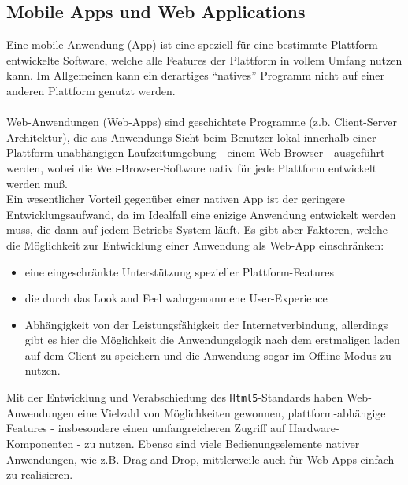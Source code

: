 \subsection{Mobile Apps und Web Applications}\label{4_MAWA}
Eine mobile Anwendung (App) ist eine speziell für eine bestimmte Plattform entwickelte Software, welche
alle Features der Plattform in vollem Umfang nutzen kann. Im Allgemeinen kann ein derartiges "`natives"' Programm nicht auf einer anderen Plattform genutzt werden.\\ \\
Web-Anwendungen (Web-Apps) sind geschichtete Programme (z.b. Client-Server Architektur), die aus Anwendungs-Sicht beim Benutzer lokal innerhalb einer Plattform-unabhängigen Laufzeitumgebung - einem Web-Browser - ausgeführt werden, wobei die Web-Browser-Software nativ für jede Plattform entwickelt werden muß.\\
Ein wesentlicher Vorteil gegenüber einer nativen App ist der geringere Entwicklungsaufwand, da im Idealfall eine enizige Anwendung entwickelt werden muss, die dann auf jedem Betriebs-System läuft. Es gibt aber Faktoren, welche die Möglichkeit zur Entwicklung einer Anwendung als Web-App einschränken:
\begin{itemize}[leftmargin=*,noitemsep,topsep=1ex,parsep=0pt,partopsep=0pt]
\item eine eingeschränkte Unterstützung spezieller Plattform-Features
\item die durch das Look and Feel wahrgenommene User-Experience
\item Abhängigkeit von der Leistungsfähigkeit der Internetverbindung, allerdings gibt es hier die Möglichkeit die Anwendungslogik nach dem erstmaligen laden auf dem Client zu speichern und die Anwendung sogar im Offline-Modus zu nutzen.
\end{itemize}
Mit der Entwicklung und Verabschiedung des \texttt{Html5}-Standards haben Web-Anwendungen eine Vielzahl von Möglichkeiten gewonnen, plattform-abhängige Features - insbesondere einen umfangreicheren Zugriff auf Hardware-Komponenten - zu nutzen. Ebenso sind viele Bedienungselemente nativer Anwendungen, wie z.B. Drag and Drop, mittlerweile auch für Web-Apps einfach zu realisieren.

